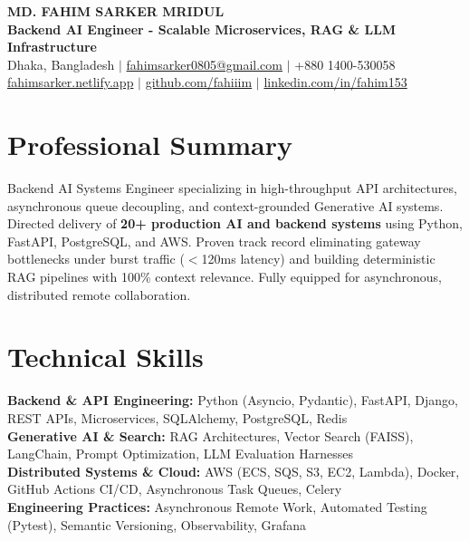 \documentclass[9.5pt,a4paper]{article}
\begin{document}
{\centering
    {\Large \textbf{MD. FAHIM SARKER MRIDUL}}\\[1pt]
    \textbf{Backend AI Engineer - Scalable Microservices, RAG \& LLM Infrastructure}\\[1pt]
    Dhaka, Bangladesh \;$\vert$\; \href{mailto:fahimsarker0805@gmail.com}{fahimsarker0805@gmail.com} \;$\vert$\; +880 1400-530058\\[1pt]
    \href{https://fahimsarker.netlify.app}{fahimsarker.netlify.app} \;$\vert$\; \href{https://github.com/fahiiim}{github.com/fahiiim} \;$\vert$\; \href{https://linkedin.com/in/fahim153}{linkedin.com/in/fahim153}\par
}

\vspace{-2.5pt}
\section*{Professional Summary}
Backend AI Systems Engineer specializing in high-throughput API architectures, asynchronous queue decoupling, and context-grounded Generative AI systems. Directed delivery of \textbf{20+ production AI and backend systems} using Python, FastAPI, PostgreSQL, and AWS. Proven track record eliminating gateway bottlenecks under burst traffic ($<$120ms latency) and building deterministic RAG pipelines with 100\% context relevance. Fully equipped for asynchronous, distributed remote collaboration.

\section*{Technical Skills}
\noindent
\textbf{Backend \& API Engineering:} Python (Asyncio, Pydantic), FastAPI, Django, REST APIs, Microservices, SQLAlchemy, PostgreSQL, Redis\\
\textbf{Generative AI \& Search:} RAG Architectures, Vector Search (FAISS), LangChain, Prompt Optimization, LLM Evaluation Harnesses\\
\textbf{Distributed Systems \& Cloud:} AWS (ECS, SQS, S3, EC2, Lambda), Docker, GitHub Actions CI/CD, Asynchronous Task Queues, Celery\\
\textbf{Engineering Practices:} Asynchronous Remote Work, Automated Testing (Pytest), Semantic Versioning, Observability, Grafana
\end{document}
